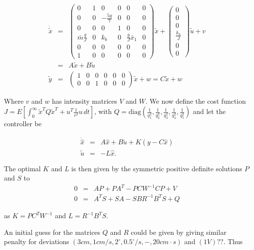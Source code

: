 \begin{eqnarray*}
\dot{\tilde{x}} & = & \begin{pmatrix}0 & 1 & 0 & 0 & 0 & 0\\
0 & 0 & -\frac{5g}{7} & 0 & 0 & 0\\
0 & 0 & 0 & 1 & 0 & 0\\
\bar{m}\frac{g}{J} & 0 & k_{b} & 0 & \frac{g}{J}\bar{x}_{1} & 0\\
0 & 0 & 0 & 0 & 0 & 0\\
1 & 0 & 0 & 0 & 0 & 0
\end{pmatrix}\tilde{x}+\begin{pmatrix}0\\
0\\
0\\
\frac{k_{u}}{J}\\
0\\
0
\end{pmatrix}\tilde{u}+v\\
 & = & A\tilde{x}+B\tilde{u}\\
\tilde{y} & = & \begin{pmatrix}1 & 0 & 0 & 0 & 0 & 0\\
0 & 0 & 1 & 0 & 0 & 0
\end{pmatrix}\tilde{x}+w=C\tilde{x}+w
\end{eqnarray*}


Where $v$ and $w$ has intensity matrices $V$ and $W$. We now define
the cost function $J=E\left[\int_{0}^{\infty}\tilde{x}^{T}Q\tilde{x}^{T}+u^{T}\frac{1}{r^{2}}u\, dt\right]$,
with $Q=\text{diag}\left(\frac{1}{q_{1}^{2}},\frac{1}{q_{2}^{2}},\frac{1}{q_{3}^{2}},\frac{1}{q_{4}^{2}},\frac{1}{q_{5}^{2}}\right)$
and let the controller be

\begin{eqnarray*}
\dot{\hat{x}} & = & A\hat{x}+B\tilde{u}+K(y-C\hat{x})\\
\tilde{u} & = & -L\hat{x}.
\end{eqnarray*}


The optimal $K$ and $L$ is then given by the symmetric positive
definite solutions $P$ and $S$ to 
\begin{eqnarray*}
0 & = & AP+PA^{T}-PCW^{-1}CP+V\\
0 & = & A^{T}S+SA-SBR^{-1}B^{T}S+Q
\end{eqnarray*}


as $K=PC^{T}W^{-1}$ and $L=R^{-1}B^{T}S$.

An initial guess for the matrices $Q$ and $R$ could be given by
giving similar penalty for deviations $(3cm,1cm/s,2^{\circ},0.5^{\circ}/s,-,20cm\cdot s)$
and $(1V)??$. Thus

